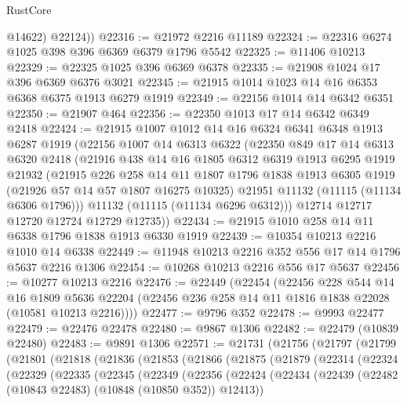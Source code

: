 \begin{lexlean}{RustCore}
\begin{coremodule}
          @14622)
        @22124))
@22316 := @21972 @2216 @11189
@22324 := @22316 @6274 @1025 @398 @396 @6369 @6379 @1796 @5542
@22325 := @11406 @10213
@22329 := @22325 @1025 @396 @6369 @6378
@22335 := @21908 @1024 @17 @396 @6369 @6376 @3021
@22345 := @21915 @1014 @1023 @14 @16 @6353 @6368 @6375 @1913 @6279 @1919
@22349 := @22156 @1014 @14 @6342 @6351
@22350 := @21907 @464
@22356 := @22350 @1013 @17 @14 @6342 @6349 @2418
@22424 := @21915
    @1007
    @1012
    @14
    @16
    @6324
    @6341
    @6348
    @1913
    @6287
    @1919
    (@22156
      @1007
      @14
      @6313
      @6322
      (@22350
        @849
        @17
        @14
        @6313
        @6320
        @2418
        (@21916
          @438
          @14
          @16
          @1805
          @6312
          @6319
          @1913
          @6295
          @1919
          @21932
          (@21915
            @226
            @258
            @14
            @11
            @1807
            @1796
            @1838
            @1913
            @6305
            @1919
            (@21926 @57 @14 @57 @1807 @16275 @10325)
            @21951
            @11132
            (@11115 (@11134 @6306 @1796)))
          @11132
          (@11115 (@11134 @6296 @6312)))
        @12714
        @12717
        @12720
        @12724
        @12729
        @12735))
@22434 := @21915 @1010 @258 @14 @11 @6338 @1796 @1838 @1913 @6330 @1919
@22439 := @10354 @10213 @2216 @1010 @14 @6338
@22449 := @11948 @10213 @2216 @352 @556 @17 @14 @1796 @5637 @2216 @1306
@22454 := @10268 @10213 @2216 @556 @17 @5637
@22456 := @10277 @10213 @2216
@22476 := @22449
    (@22454
      (@22456
        @228
        @544
        @14
        @16
        @1809
        @5636
        @22204
        (@22456 @236 @258 @14 @11 @1816 @1838 @22028 (@10581 @10213 @2216))))
@22477 := @9796 @352
@22478 := @9993 @22477
@22479 := @22476 @22478
@22480 := @9867 @1306
@22482 := @22479 (@10839 @22480)
@22483 := @9891 @1306
@22571 := @21731
    (@21756
      (@21797
        (@21799
          (@21801
            (@21818
              (@21836
                (@21853
                  (@21866
                    (@21875
                      (@21879
                        (@22314
                          (@22324
                            (@22329
                              (@22335
                                (@22345
                                  (@22349
                                    (@22356
                                      (@22424
                                        (@22434
                                          (@22439
                                            (@22482 (@10843 @22483) (@10848 (@10850 @352)) @12413))

\end{coremodule}
\end{lexlean}
